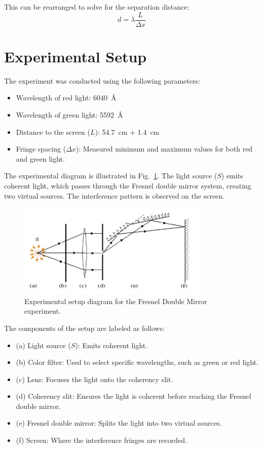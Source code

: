 \documentclass[journal]{IEEEtran}
\begin{document}
This can be rearranged to solve for the separation distance:
\begin{equation}
    d = \lambda \frac{L}{\Delta x}
\end{equation}


\section{Experimental Setup}
The experiment was conducted using the following parameters:
\begin{itemize}
    \item Wavelength of red light: \SI{6040}{\angstrom}
    \item Wavelength of green light: \SI{5592}{\angstrom}
    \item Distance to the screen ($L$): \SI{54.7}{\centi\meter} + \SI{1.4}{\centi\meter}
    \item Fringe spacing ($\Delta x$): Measured minimum and maximum values for both red and green light.
\end{itemize}

The experimental diagram is illustrated in Fig.~\ref{fig:setup_diagram}. The light source ($S$) emits coherent light, which passes through the Fresnel double mirror system, creating two virtual sources. The interference pattern is observed on the screen.

\begin{figure}[H]
    \centering
    \includegraphics[width=0.8\linewidth]{../IMAGES/setup_diagram.png}
    \caption{Experimental setup diagram for the Fresnel Double Mirror experiment.}
    \label{fig:setup_diagram}
\end{figure}

The components of the setup are labeled as follows:
\begin{itemize}
    \item (a) Light source ($S$): Emits coherent light.
    \item (b) Color filter: Used to select specific wavelengths, such as green or red light.
    \item (c) Lens: Focuses the light onto the coherency slit.
    \item (d) Coherency slit: Ensures the light is coherent before reaching the Fresnel double mirror.
    \item (e) Fresnel double mirror: Splits the light into two virtual sources.
    \item (f) Screen: Where the interference fringes are recorded.
\end{itemize}
\end{document}
